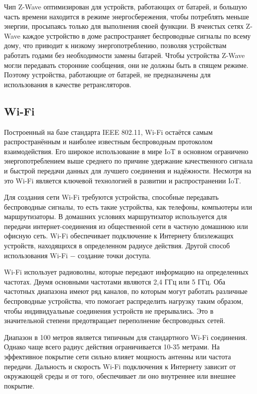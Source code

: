 	Чип Z-Wave оптимизирован для устройств, работающих от батарей, и большую часть времени находится 
	в режиме энергосбережения, чтобы потреблять меньше энергии, просыпаясь только для выполнения своей 
	функции. В ячеистых сетях Z-Wave каждое устройство в доме распространяет беспроводные сигналы по 
	всему дому, что приводит к низкому энергопотреблению, позволяя устройствам работать годами без 
	необходимости замены батарей. Чтобы устройства Z-Wave могли передавать сторонние сообщения, 
	они не должны быть в спящем режиме. Поэтому устройства, работающие от батарей, не предназначены для 
	использования в качестве ретрансляторов.
	
	
	\subsection{Wi-Fi}
	Построенный на базе стандарта IEEE 802.11, Wi-Fi остаётся самым распространённым и наиболее
	известным беспроводным протоколом взаимодействия. Его широкое использование в мире IoT в
	основном ограничено энергопотреблением выше среднего по причине удержание качественного сигнала
	и быстрой передачи данных для лучшего соединения и надёжности. Несмотря на это Wi-Fi является
	ключевой технологией в развитии и распространении IoT.
	
	Для создания сети Wi-Fi требуются устройства, способные передавать беспроводные сигналы, то есть 
	такие устройства, как телефоны, компьютеры или маршрутизаторы. В домашних условиях маршрутизатор 
	используется для передачи интернет-соединения из общественной сети в частную домашнюю или офисную 
	сеть. Wi-Fi обеспечивает подключение к Интернету близлежащих устройств, находящихся в определенном 
	радиусе действия. Другой способ использования Wi-Fi $-$ создание точки доступа.
	
	Wi-Fi использует радиоволны, которые передают информацию на определенных частотах. Двумя основными
	частотами являются 2,4 ГГц или 5 ГГц. Оба частотных диапазона имеют ряд каналов, по которым могут 
	работать различные беспроводные устройства, что помогает распределить нагрузку таким образом, 
	чтобы индивидуальные соединения устройств не прерывались. Это в значительной степени предотвращает 
	переполнение беспроводных сетей.
	
	Диапазон в 100 метров является типичным для стандартного Wi-Fi соединения. Однако чаще всего радиус 
	действия ограничивается 10-35 метрами. На эффективное покрытие сети сильно влияет мощность антенны 
	или частота передачи. Дальность и скорость Wi-Fi подключения к Интернету зависит от окружающей среды 
	и от того, обеспечивает ли оно внутреннее или внешнее покрытие.
	
